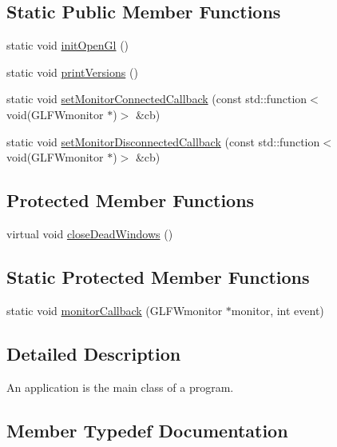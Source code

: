 \subsection*{Static Public Member Functions}
\begin{DoxyCompactItemize}
\item 
static void \mbox{\hyperlink{classec_1_1_application_a8d6ef43e247b541017fa82e001c42995}{init\+Open\+Gl}} ()
\item 
static void \mbox{\hyperlink{classec_1_1_application_a329a3b03c23e5aba31bbbb175930dbae}{print\+Versions}} ()
\item 
static void \mbox{\hyperlink{classec_1_1_application_a9a3c539d9fef8d51ce3c32b63d11b495}{set\+Monitor\+Connected\+Callback}} (const std\+::function$<$ void(G\+L\+F\+Wmonitor $\ast$)$>$ \&cb)
\item 
static void \mbox{\hyperlink{classec_1_1_application_acc0a3dd9509ade9a6297b816d07441d6}{set\+Monitor\+Disconnected\+Callback}} (const std\+::function$<$ void(G\+L\+F\+Wmonitor $\ast$)$>$ \&cb)
\end{DoxyCompactItemize}
\subsection*{Protected Member Functions}
\begin{DoxyCompactItemize}
\item 
virtual void \mbox{\hyperlink{classec_1_1_application_ad6a3915f4ea913bf392a03fbd3548d99}{close\+Dead\+Windows}} ()
\end{DoxyCompactItemize}
\subsection*{Static Protected Member Functions}
\begin{DoxyCompactItemize}
\item 
static void \mbox{\hyperlink{classec_1_1_application_adaeb3f63d8e850d7b83f1c1b61bc73d1}{monitor\+Callback}} (G\+L\+F\+Wmonitor $\ast$monitor, int event)
\end{DoxyCompactItemize}


\subsection{Detailed Description}
An application is the main class of a program. 

\subsection{Member Typedef Documentation}
\mbox{\label{classec_1_1_application_af1e09a0f1b603eab8d3245d8b8075ad5}} 
